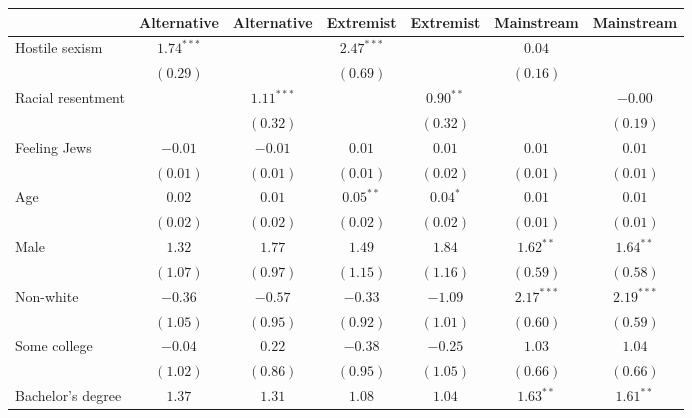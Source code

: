 
\usepackage{booktabs}

\begin{table}
\begin{center}
\begin{tabular}{l c c c c c c}
\toprule
 & Alternative & Alternative & Extremist & Extremist & Mainstream & Mainstream \\
\midrule
Hostile sexism    & $1.74^{***}$ &               & $2.47^{***}$  &               & $0.04$        &              \\
                  & $(0.29)$     &               & $(0.69)$      &               & $(0.16)$      &              \\
Racial resentment &              & $1.11^{***}$  &               & $0.90^{**}$   &               & $-0.00$      \\
                  &              & $(0.32)$      &               & $(0.32)$      &               & $(0.19)$     \\
Feeling Jews      & $-0.01$      & $-0.01$       & $0.01$        & $0.01$        & $0.01$        & $0.01$       \\
                  & $(0.01)$     & $(0.01)$      & $(0.01)$      & $(0.02)$      & $(0.01)$      & $(0.01)$     \\
Age               & $0.02$       & $0.01$        & $0.05^{**}$   & $0.04^{*}$    & $0.01$        & $0.01$       \\
                  & $(0.02)$     & $(0.02)$      & $(0.02)$      & $(0.02)$      & $(0.01)$      & $(0.01)$     \\
Male              & $1.32$       & $1.77$        & $1.49$        & $1.84$        & $1.62^{**}$   & $1.64^{**}$  \\
                  & $(1.07)$     & $(0.97)$      & $(1.15)$      & $(1.16)$      & $(0.59)$      & $(0.58)$     \\
Non-white         & $-0.36$      & $-0.57$       & $-0.33$       & $-1.09$       & $2.17^{***}$  & $2.19^{***}$ \\
                  & $(1.05)$     & $(0.95)$      & $(0.92)$      & $(1.01)$      & $(0.60)$      & $(0.59)$     \\
Some college      & $-0.04$      & $0.22$        & $-0.38$       & $-0.25$       & $1.03$        & $1.04$       \\
                  & $(1.02)$     & $(0.86)$      & $(0.95)$      & $(1.05)$      & $(0.66)$      & $(0.66)$     \\
Bachelor's degree & $1.37$       & $1.31$        & $1.08$        & $1.04$        & $1.63^{**}$   & $1.61^{**}$  \\

\end{tabular}
\end{center}
\end{table}
